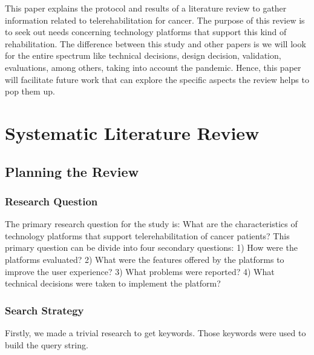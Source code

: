 \documentclass[conference]{IEEEtran}
\begin{document}
This paper explains the protocol and results of a literature review to gather information related to telerehabilitation for cancer. The purpose of this review is to seek out needs concerning technology platforms that support this kind of rehabilitation. The difference between this study and other papers is we will look for the entire spectrum like technical decisions, design decision, validation, evaluations, among others, taking into account the pandemic. Hence, this paper will facilitate future work that can explore the specific aspects the review helps to pop them up.


\section{Systematic Literature Review}

\subsection{Planning the Review}

\subsubsection{Research Question}
The primary research question for the study is: What are the characteristics of technology platforms that support telerehabilitation of cancer patients? This primary question can be divide into four secondary questions: 1) How were the platforms evaluated? 2) What were the features offered by the platforms to improve the user experience? 3) What problems were reported? 4) What technical decisions were taken to implement the platform?

\subsubsection{Search Strategy}
Firstly, we made a trivial research to get keywords. Those keywords were used to build the query string. %
\end{document}
